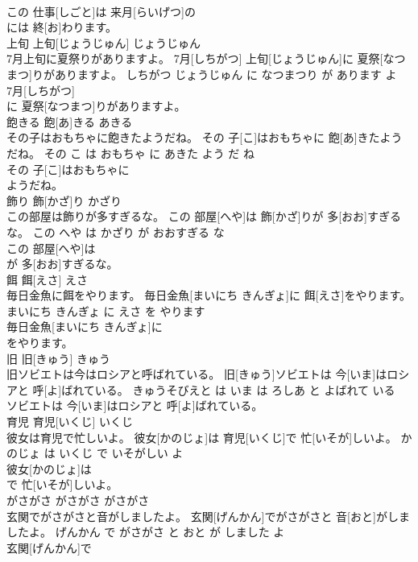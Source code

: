 \documentclass[8pt]{extreport}
\begin{document}
\begin{CJK}{UTF8}{min}
\\	この 仕事[しごと]は 来月[らいげつ]の
\\	には 終[お]わります。			
\\	上旬	上旬[じょうじゅん]	じょうじゅん	
\\	7月上旬に夏祭りがありますよ。	7月[しちがつ] 上旬[じょうじゅん]に 夏祭[なつまつ]りがありますよ。	しちがつ じょうじゅん に なつまつり が あります よ	
\\	7月[しちがつ]
\\	に 夏祭[なつまつ]りがありますよ。			
\\	飽きる	飽[あ]きる	あきる	
\\	その子はおもちゃに飽きたようだね。	その 子[こ]はおもちゃに 飽[あ]きたようだね。	その こ は おもちゃ に あきた よう だ ね	
\\	その 子[こ]はおもちゃに
\\	ようだね。			
\\	飾り	飾[かざ]り	かざり	
\\	この部屋は飾りが多すぎるな。	この 部屋[へや]は 飾[かざ]りが 多[おお]すぎるな。	この へや は かざり が おおすぎる な	
\\	この 部屋[へや]は
\\	が 多[おお]すぎるな。			
\\	餌	餌[えさ]	えさ	
\\	毎日金魚に餌をやります。	毎日金魚[まいにち きんぎょ]に 餌[えさ]をやります。	まいにち きんぎょ に えさ を やります	
\\	毎日金魚[まいにち きんぎょ]に
\\	をやります。			
\\	旧	旧[きゅう]	きゅう	
\\	旧ソビエトは今はロシアと呼ばれている。	旧[きゅう]ソビエトは 今[いま]はロシアと 呼[よ]ばれている。	きゅうそびえと は いま は ろしあ と よばれて いる	
\\	ソビエトは 今[いま]はロシアと 呼[よ]ばれている。			
\\	育児	育児[いくじ]	いくじ	
\\	彼女は育児で忙しいよ。	彼女[かのじょ]は 育児[いくじ]で 忙[いそが]しいよ。	かのじょ は いくじ で いそがしい よ	
\\	彼女[かのじょ]は
\\	で 忙[いそが]しいよ。			
\\	がさがさ	がさがさ	がさがさ	
\\	玄関でがさがさと音がしましたよ。	玄関[げんかん]でがさがさと 音[おと]がしましたよ。	げんかん で がさがさ と おと が しました よ	
\\	玄関[げんかん]で

\end{CJK}
\end{document}
